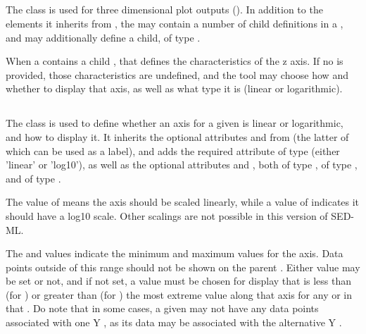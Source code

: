 \begin{blockChanged}
\begin{blockChanged}
\subsection{}
\label{class:plot3D}
\label{class:listOfSurfaces}
The \PlotThree class is used for three dimensional plot outputs (). In addition to the elements it inherits from \Plot, the \PlotThree may contain a number of child \Surface definitions in a , and may additionally define a  child, of type \Axis.

When a \PlotThree contains a child , that \Axis defines the characteristics of the z axis. If no  is provided, those characteristics are undefined, and the tool may choose how and whether to display that axis, as well as what type it is (linear or logarithmic).
\end{blockChanged}



\subsection{}
\label{class:axis}
The \Axis class is used to define whether an axis for a given \Plot is linear or logarithmic, and how to display it.  It inherits the optional attributes  and  from \SedBase (the latter of which can be used as a label), and adds the required attribute  of type \AxisKind (either 'linear' or 'log10'), as well as the optional attributes  and , both of type ,  of type , and  of type .

\begin{blockChanged}
The  value of  means the axis should be scaled linearly, while a value of  indicates it should have a log10 scale.  Other scalings are not possible in this version of SED-ML.
\end{blockChanged}

The  and  values indicate the minimum and maximum values for the axis.  Data points outside of this range should not be shown on the parent \Plot.  Either value may be set or not, and if not set, a value must be chosen for display that is less than (for ) or greater than (for ) the most extreme value along that axis for any \Curve or \Surface in that \Plot.  Do note that in some cases, a given \Curve may not have any data points associated with one Y \Axis, as its data may be associated with the alternative Y \Axis.


\end{blockChanged}
